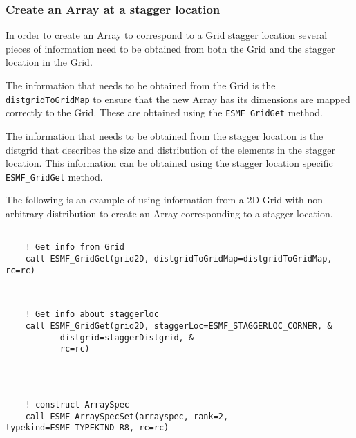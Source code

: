 
  \subsubsection{Create an Array at a stagger location}
  
   In order to create an Array to correspond to a Grid stagger location
   several pieces of information need to be obtained from both the
   Grid and the stagger location in the Grid.
  
   The information that needs to be obtained from the Grid
   is the {\tt distgridToGridMap} to ensure that the new Array
   has its  dimensions are mapped correctly to the Grid. These
   are obtained using the {\tt ESMF\_GridGet} method.
  
   The information that needs to be obtained from the stagger
   location is the distgrid that describes the size and distribution
   of the elements in the stagger location. This information can
   be obtained using the stagger location specific {\tt ESMF\_GridGet} method.
  
   The following is an example of using information from a 2D Grid with non-arbitrary
   distribution to create an Array corresponding to a stagger location.
   

 \begin{verbatim}

    ! Get info from Grid
    call ESMF_GridGet(grid2D, distgridToGridMap=distgridToGridMap, rc=rc)
 
\end{verbatim}
 

 \begin{verbatim}

    ! Get info about staggerloc
    call ESMF_GridGet(grid2D, staggerLoc=ESMF_STAGGERLOC_CORNER, &
           distgrid=staggerDistgrid, &
           rc=rc)
 
\end{verbatim}
 

 \begin{verbatim}


    ! construct ArraySpec
    call ESMF_ArraySpecSet(arrayspec, rank=2, typekind=ESMF_TYPEKIND_R8, rc=rc)
 
\end{verbatim}
 
